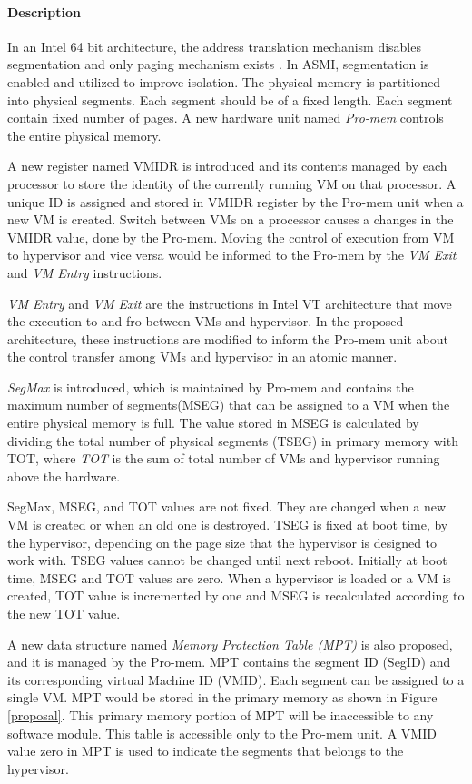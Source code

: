 \documentclass[a4paper,10pt,twocolumn]{article}
\begin{document}
   \paragraph{Description}In an Intel 64 bit architecture, the address translation mechanism disables  segmentation and only paging mechanism  exists \cite{64-ia-32-arch-manual-325462}. In ASMI,   segmentation is enabled and utilized to improve isolation. The physical memory is partitioned into physical segments. Each segment should be of a fixed length. Each segment contain fixed number of pages. A new hardware unit named \textit{Pro-mem} controls the entire physical memory.

  A new register named VMIDR is introduced and its contents managed by each processor to store the identity of  the currently running VM on that processor. A unique ID is assigned and stored in VMIDR register by the Pro-mem unit when a new VM is created. Switch between VMs on a processor causes a changes in the VMIDR value, done by the Pro-mem. Moving the control of execution from VM to hypervisor and vice versa would be informed to the Pro-mem by the \emph{VM Exit} and \emph{VM Entry} instructions.

  \emph{VM Entry} and \emph{VM Exit} are the instructions in Intel VT architecture \cite{vt-directed-io-spec} that move the execution to and fro between VMs and hypervisor. In the proposed architecture, these instructions are modified to inform the Pro-mem unit about the control transfer among VMs and hypervisor in an atomic manner.

  \emph{SegMax} is introduced, which is maintained by Pro-mem and contains the maximum number of segments(MSEG) that can be assigned to a VM when the entire physical memory is full.  The value stored in MSEG is calculated by dividing the total number of physical segments (TSEG) in primary memory with TOT, where \emph{TOT} is the sum of total number of VMs and hypervisor running above the hardware.

  SegMax, MSEG, and TOT values are not fixed. They are changed  when a new VM is created or when an old one is destroyed. TSEG is fixed at boot time, by the hypervisor, depending on the page size that the hypervisor is designed to work with. TSEG values cannot be changed until next reboot. Initially at boot time, MSEG and TOT values are zero. When a hypervisor is loaded or a VM is created, TOT value is incremented by one and MSEG is recalculated according to the new TOT value.

  A new data structure named \textit{Memory Protection Table (MPT)} is also proposed, and it is managed by the Pro-mem. MPT contains the segment ID (SegID) and its corresponding virtual Machine ID (VMID). Each segment can be assigned to a single VM.  MPT would be stored in the primary memory as shown in Figure \ref{proposal}. This primary memory portion of MPT will be inaccessible to any software module. This table is accessible only to the Pro-mem unit. A VMID value zero in MPT is used to indicate the segments that belongs to the hypervisor.
\end{document}
